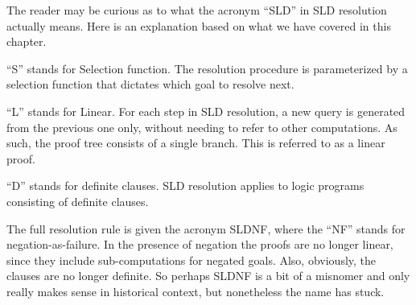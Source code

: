 The reader may be curious as to what the acronym ``SLD''
in SLD resolution actually means.
Here is an explanation
based on what we have covered in this chapter.

``S'' stands for Selection function.
The resolution procedure is parameterized by
a selection function that dictates which goal to resolve next.

``L'' stands for Linear.
For each step in SLD resolution,
a new query is generated from the previous one only,
without needing to refer to other computations.
As such,
the proof tree consists of a single branch.
This is referred to as a linear proof.

``D'' stands for definite clauses.
SLD resolution applies to logic programs
consisting of definite clauses.

The full resolution rule is given the acronym SLDNF,
where the ``NF'' stands for negation-as-failure.
In the presence of negation the proofs are no longer linear,
since they include sub-computations for negated goals.
Also, obviously, the clauses are no longer definite.
So perhaps SLDNF is a bit of a misnomer
and only really makes sense in historical context,
but nonetheless the name has stuck.
